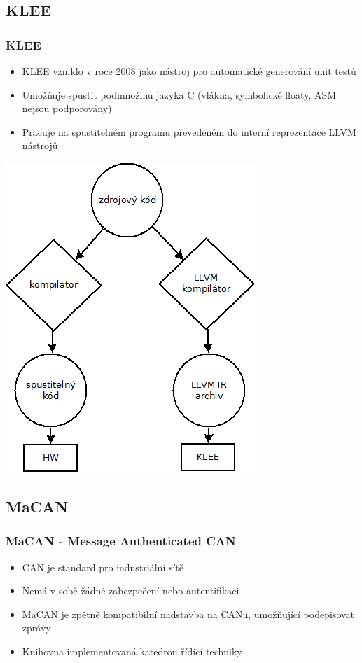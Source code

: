 \documentclass{beamer}
\begin{document}
\subsection*{KLEE}
\begin{frame}
\frametitle{KLEE}
\begin{itemize}
    \item KLEE vzniklo v roce 2008 jako nástroj pro automatické generování
    unit testů
    \item Umožňuje spustit podmnožinu jazyka C (vlákna, symbolické floaty, ASM nejsou podporovány)
    \item Pracuje na spustitelném programu převedeném do interní reprezentace LLVM nástrojů
\end{itemize}
\end{frame}

\begin{frame}
\begin{center}
\includegraphics[scale=0.38]{kompilace.png}
\end{center}
\end{frame}

\subsection*{MaCAN}
\begin{frame}
\frametitle{MaCAN - Message Authenticated CAN}
\begin{itemize}
    \item CAN je standard pro industriální sítě
    \item Nemá v sobě žádné zabezpečení nebo autentifikaci
    \item MaCAN je zpětně kompatibilní nadstavba na CANu, umožňující
    podepisovat zprávy
    \item Knihovna implementovaná katedrou řídící techniky
\end{itemize}
\end{frame}
\end{document}
